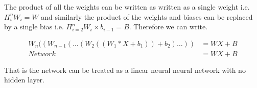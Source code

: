 \documentclass[12pt]{report}
\begin{document}
The product of all the weights can be written as written as a single weight i.e. $\Pi_i^n W_i = W$ and similarly the product of the weights and biases can be replaced by a single bias i.e. $\Pi_{i=2}^n W_i \times b_{i-1} = B$. Therefore we can write.

\begin{equation*}
	\begin{split}
		W_n((W_{n-1}(\dots (W_2((W_1*X + b_1) )+b_2) \dots )) & = WX + B \\
		Network &= WX + B 
	\end{split}
\end{equation*}

That is the network can be treated as a linear neural neural network with no hidden layer.
\end{document}
